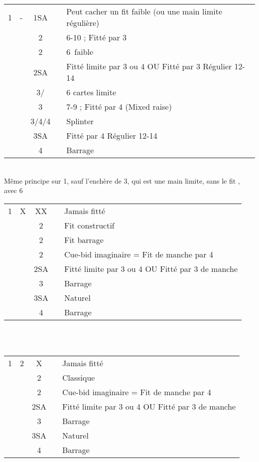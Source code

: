 \documentclass[a4paper, oneside, 11pt]{report}
\begin{document}
		\begin{tabular}{cccc|l}
		1\coeur & - & 1SA && Peut cacher un fit faible (ou une main limite régulière)\\
		&& 2\coeur && 6-10 ; Fitté par 3\\
		&& 2\pique && 6\pique\ faible\\
		&& 2SA && Fitté limite par 3 ou 4 OU Fitté par 3 Régulier 12-14  \\
		&& 3\trefle/\carreau && 6 cartes limite\\
		&& 3\coeur && 7-9 ; Fitté par 4 (Mixed raise)\\
		&& 3\pique/4\trefle/4\carreau && Splinter\\
		&& 3SA && Fitté par 4 Régulier 12-14\\
		&& 4\coeur && Barrage\\
		\end{tabular}\\

		Même principe sur 1\pique, sauf l'enchère de 3\coeur, qui est une main limite, sans le fit \pique,  avec 6\coeur\\

		\begin{tabular}{cccc|l}
		1\coeur & X & XX && Jamais fitté\\
		&& 2\carreau && Fit constructif\\
		&& 2\coeur && Fit barrage\\
		&& 2\pique && Cue-bid imaginaire = Fit de manche par 4\\
		&& 2SA && Fitté limite par 3 ou 4 OU Fitté par 3 de manche\\
		&& 3\coeur && Barrage\\
		&& 3SA && Naturel\\
		&& 4\coeur && Barrage\\
		\end{tabular}\\\\

		\begin{tabular}{cccc|l}
		1\coeur & 2\trefle & X && Jamais fitté\\
		&& 2\coeur && Classique\\
		&& 2\pique && Cue-bid imaginaire = Fit de manche par 4\\
		&& 2SA && Fitté limite par 3 ou 4 OU Fitté par 3 de manche\\
		&& 3\coeur && Barrage\\
		&& 3SA && Naturel\\
		&& 4\coeur && Barrage\\
		\end{tabular}\\\\
\end{document}
